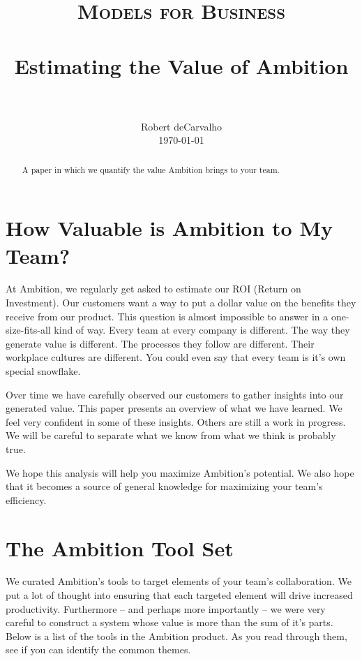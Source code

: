 \documentclass[paper=a4, fontsize=11pt abstract]{scrartcl}
\title{
		\usefont{OT1}{bch}{b}{n}
		\normalfont \normalsize \textsc{Models for Business} \\ [25pt]
		\horrule{0.5pt} \\[0.4cm]
		\huge Estimating the Value of Ambition\\
		\horrule{2pt} \\[0.5cm]
}
\author{
		\normalfont
		\normalsize
        Robert deCarvalho\\[-3pt]
        \normalsize
        \today
}
\date{}
\numberwithin{equation}{section}		%
\numberwithin{figure}{section}			%
\numberwithin{table}{section}				%
\begin{document}
\maketitle


\begin{abstract}
A paper in which we quantify the value Ambition brings to your team.
\end{abstract}


\section{How Valuable is Ambition to My Team?}

At Ambition, we regularly get asked to estimate our ROI (Return on Investment).
Our customers want a way to put a dollar value on the benefits they receive from our product.
This question is almost impossible to answer in a one-size-fits-all kind of way.
Every team at every company is different.
The way they generate value is different.
The processes they follow are different.
Their workplace cultures are different.
You could even say that every team is it's own special snowflake.

Over time we have carefully observed our customers to gather insights into our generated value.
This paper presents an overview of what we have learned.
We feel very confident in some of these insights.  
Others are still a work in progress.
We will be careful to separate what we know from what we think is probably true.


We hope this analysis will help you maximize Ambition's potential.
We also hope that it becomes a source of general knowledge for maximizing your team's efficiency.

\section{The Ambition Tool Set}
We curated Ambition's tools to target elements of your team's collaboration.  We put a lot of thought into ensuring that each targeted element will drive increased productivity.
Furthermore -- and perhaps more importantly -- we were very careful to construct a system whose value is more than the sum of it's parts.
Below is a list of the tools in the Ambition product.
As you read through them, see if you can identify the common themes.
\end{document}

